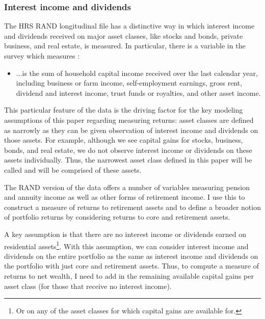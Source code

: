 \subsubsection{Interest income and dividends}

\par The HRS RAND longitudinal file has a distinctive way in which interest income and dividends received on major asset classes, like stocks and bonds, private business, and real estate, is measured. In particular, there is a variable in the survey which measures :

\begin{itemize}
  \item $\ldots$is the sum of household capital income received over the last calendar year, including business or farm income, self-employment earnings, gross rent, dividend and interest income, trust funds or royalties, and other asset income.
  \end{itemize}

  This particular feature of the data is the driving factor for the key modeling assumptions of this paper regarding measuring returns: asset classes are defined as narrowly as they can be given observation of interest income and dividends on those assets. For example, although we see capital gains for stocks, business, bonds, and real estate, we do not observe interest income or dividends on these assets individually. Thus, the narrowest asset class defined in this paper will be called  and will be comprised of these assets.

  \par The RAND version of the data offers a number of variables measuring pension and annuity income as well as other forms of retirement income. I use this to construct a measure of returns to retirement assets and to define a broader notion of portfolio returns by considering returns to core and retirement assets.

  \par A key assumption is that there are no interest income or dividends earned on residential assets\footnote{Or on any of the asset classes for which capital gains are available for.}. With this assumption, we can consider interest income and dividends on the entire portfolio as the same as interest income and dividends on the portfolio with just core and retirement assets. Thus, to compute a measure of returns to net wealth, I need to add in the remaining available capital gains per asset class (for those that receive no interest income). 

